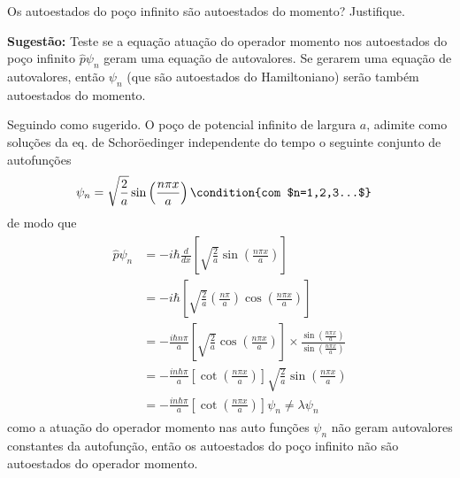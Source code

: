 	 \begin{prob}
		 Os autoestados do poço infinito são autoestados do momento? Justifique.
		 \par\noindent\textbf{Sugestão:} Teste se a equação atuação do operador  momento  nos autoestados do poço infinito $\hat{p} \psi_{n}$ geram uma equação de autovalores. Se gerarem uma equação de autovalores, então $\psi_{n}$ (que são autoestados do Hamiltoniano) serão também  autoestados do momento.
		 \begin{sol}
		 	Seguindo como sugerido. O poço de potencial infinito de largura $a$, adimite como soluções da eq. de Schoröedinger independente do tempo o seguinte conjunto de autofunções
			\begin{align}
				\psi_{n} &= \sqrt{\frac{2}{a}}\sin \left(\frac{n \pi x}{a}\right)\condition{com $n=1,2,3...$}
			\end{align}
			de modo que
			\begin{align}
				\begin{split}
					\hat{p} \psi_{n} &= -i \hbar{} \frac{d}{dx}\left[\sqrt{\frac{2}{a}}\sin \left(\frac{n \pi x}{a}\right)\right]\\
													 &= -i \hbar{}\left[\sqrt{\frac{2}{a}}\left(\frac{n \pi}{a}\right)\cos \left(\frac{n \pi x}{a}\right)\right]\\
													 &= -\frac{i \hbar n \pi}{a}\left[\sqrt{\frac{2}{a}}\cos \left(\frac{n \pi x}{a}\right)\right]\times \frac{\sin \left(\frac{n \pi x}{a}\right)}{\sin \left(\frac{n \pi x}{a}\right)}\\
													 &= -\frac{in \hbar{ \pi}}{a}\left[\cot \left(\frac{n \pi x}{a}\right)\right]\sqrt{\frac{2}{a}}\sin \left(\frac{n \pi x}{a}\right)\\
													 &= -\frac{in \hbar{} \pi}{a}\left[\cot \left(\frac{n \pi x}{a}\right)\right] \psi_{n}\neq \lambda \psi_{n}
				\end{split}
			\end{align}
			como a atuação do operador momento nas auto funções $\psi_{n}$ não geram autovalores constantes da autofunção, então os autoestados do poço infinito não são autoestados do operador momento. 
		 \end{sol}
	 \end{prob}


